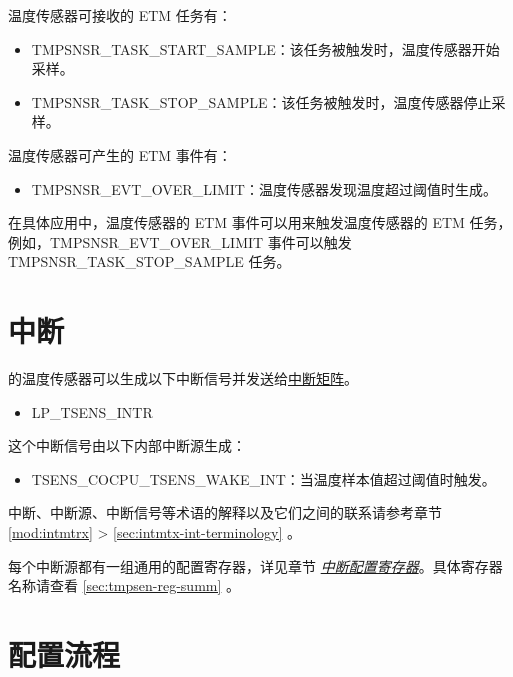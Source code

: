 \documentclass[main\_\_CN.tex]{subfiles}
\begin{document}
温度传感器可接收的 ETM 任务有：

\begin{itemize}
    \item TMPSNSR\_TASK\_START\_SAMPLE：该任务被触发时，温度传感器开始采样。
    \item TMPSNSR\_TASK\_STOP\_SAMPLE：该任务被触发时，温度传感器停止采样。
\end{itemize}

温度传感器可产生的 ETM 事件有：

\begin{itemize}
    \item TMPSNSR\_EVT\_OVER\_LIMIT：温度传感器发现温度超过阈值时生成。
\end{itemize}

在具体应用中，温度传感器的 ETM 事件可以用来触发温度传感器的 ETM 任务，例如，TMPSNSR\_EVT\_OVER\_LIMIT 事件可以触发 TMPSNSR\_TASK\_STOP\_SAMPLE 任务。


\section{中断}

\chipname{} 的温度传感器可以生成以下中断信号并发送给\hyperref[mod:intmtrx]{中断矩阵}。

    \begin{itemize}
        \item LP\_TSENS\_INTR
    \end{itemize}

这个中断信号由以下内部中断源生成：
    \begin{itemize}
        \item TSENS\_COCPU\_TSENS\_WAKE\_INT\label{int:TSENSINT}：当温度样本值超过阈值时触发。
    \end{itemize}

\begin{tiplisting}
中断、中断源、中断信号等术语的解释以及它们之间的联系请参考章节 \ref{mod:intmtrx} \textit{} > \ref{sec:intmtx-int-terminology} \textit{}。
\end{tiplisting}

每个中断源都有一组通用的配置寄存器，详见章节 \hyperref[interrupt-config-registers]{\textit{中断配置寄存器}}。具体寄存器名称请查看 \ref{sec:tmpsen-reg-summ} \textit{}。

\section{配置流程}
\end{document}
